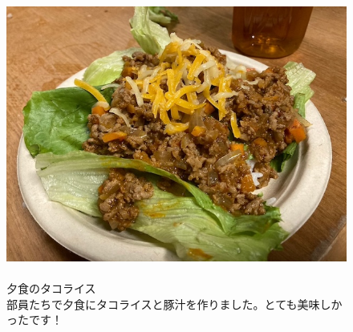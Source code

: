 \documentclass[../main]{subfiles}
\begin{document}
\begin{figure}[H]
  \begin{minipage}[b]{0.48\columnwidth}
    \caption{\\
    夕食のタコライス\\
    部員たちで夕食にタコライスと豚汁を作りました。とても美味しかったです！
    }
  \end{minipage}
  \hspace{0.04\columnwidth} %
  \begin{minipage}[b]{0.48\columnwidth}
    \centering
    \includegraphics[width=\columnwidth]{figure/takoraisu.JPG}
  \end{minipage}
\end{figure}
\end{document}
